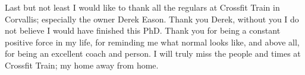 Last but not least I would like to thank all the regulars at Crossfit Train in
Corvallis; especially the owner Derek Eason. Thank you Derek, without you I do
not believe I would have finished this PhD. Thank you for being a constant
positive force in my life, for reminding me what normal looks like, and above
all, for being an excellent coach and person. I will truly miss the people and
times at Crossfit Train; my home away from home.

